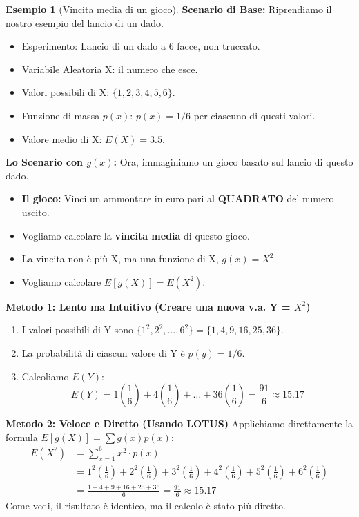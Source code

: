 \documentclass[a4paper, 11pt]{article}
\theoremstyle{definition}
\newtheorem{esempio}{Esempio}[section]
\begin{document}
\begin{esempio}[Vincita media di un gioco]
\textbf{Scenario di Base:} Riprendiamo il nostro esempio del lancio di un dado.
\begin{itemize}
    \item Esperimento: Lancio di un dado a 6 facce, non truccato.
    \item Variabile Aleatoria X: il numero che esce.
    \item Valori possibili di X: $\{1, 2, 3, 4, 5, 6\}$.
    \item Funzione di massa $p(x)$: $p(x) = 1/6$ per ciascuno di questi valori.
    \item Valore medio di X: $E(X) = 3.5$.
\end{itemize}
\textbf{Lo Scenario con $g(x)$:} Ora, immaginiamo un gioco basato sul lancio di questo dado.
\begin{itemize}
    \item \textbf{Il gioco:} Vinci un ammontare in euro pari al \textbf{QUADRATO} del numero uscito.
    \item Vogliamo calcolare la \textbf{vincita media} di questo gioco.
    \item La vincita non è più X, ma una funzione di X, $g(x) = X^2$.
    \item Vogliamo calcolare $E[g(X)] = E(X^2)$.
\end{itemize}

\textbf{Metodo 1: Lento ma Intuitivo (Creare una nuova v.a. Y = $X^2$)}
\begin{enumerate}
    \item I valori possibili di Y sono $\{1^2, 2^2, \dots, 6^2\} = \{1, 4, 9, 16, 25, 36\}$.
    \item La probabilità di ciascun valore di Y è $p(y)=1/6$.
    \item Calcoliamo $E(Y)$:
    \[ E(Y) = 1\left(\frac{1}{6}\right) + 4\left(\frac{1}{6}\right) + \dots + 36\left(\frac{1}{6}\right) = \frac{91}{6} \approx 15.17 \]
\end{enumerate}

\textbf{Metodo 2: Veloce e Diretto (Usando LOTUS)}
Applichiamo direttamente la formula $E[g(X)] = \sum g(x)p(x)$:
\begin{align*}
    E(X^2) &= \sum_{x=1}^{6} x^2 \cdot p(x) \\
            &= 1^2\left(\frac{1}{6}\right) + 2^2\left(\frac{1}{6}\right) + 3^2\left(\frac{1}{6}\right) + 4^2\left(\frac{1}{6}\right) + 5^2\left(\frac{1}{6}\right) + 6^2\left(\frac{1}{6}\right) \\
            &= \frac{1+4+9+16+25+36}{6} = \frac{91}{6} \approx 15.17
\end{align*}
Come vedi, il risultato è identico, ma il calcolo è stato più diretto.
\end{esempio}
\end{document}
